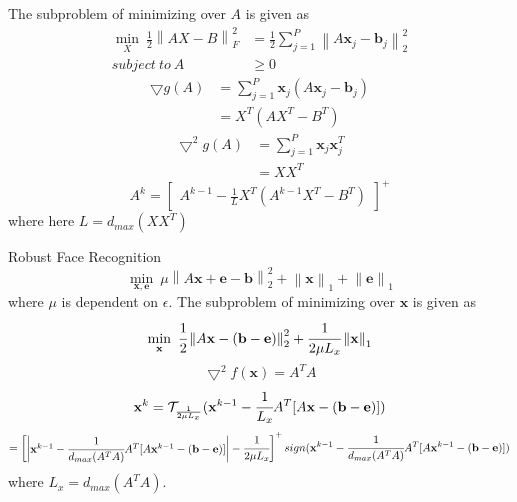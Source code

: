 \documentclass[paper=a4, fontsize=11pt]{scrartcl} %
\makeatletter
\numberwithin{equation}{section} %
\numberwithin{figure}{section} %
\numberwithin{table}{section} %
\renewcommand{\section}{\@startsection{section}{1}{0mm}
  {-\baselineskip}{0.5 \baselineskip}{\bf\leftline}}
\newcommand{\norm}[1]{\left\lVert #1 \right\rVert}
\makeatother
\begin{document}
The subproblem of minimizing over $A$ is given as
\begin{equation}
\begin{split}
 \min_X\ \frac{1}{2}\norm{AX-B}_F^2 &=\frac{1}{2}\sum_{j=1}^P\norm{A\mathbf{x}_j-\mathbf{b}_j}_2^2 \\
 subject~to~A &\geq 0 
\end{split}
\end{equation}
\begin{equation}
\begin{split}
\bigtriangledown g(A) &= \sum_{j=1}^P \mathbf{x}_j(A\mathbf{x}_j-\mathbf{b}_j)\\
& = X^T(AX^T-B^T)
\end{split}
\end{equation}
\begin{equation}
\begin{split}
\bigtriangledown^2 g(A) &= \sum_{j=1}^P \mathbf{x}_j\mathbf{x}_j^T \\
& = XX^T
\end{split}
\end{equation}
\begin{equation}
A^k = \begin{bmatrix}
A^{k-1} - \frac{1}{L}X^T(A^{k-1}X^T-B^T)
\end{bmatrix}^+
\end{equation}
where here $L = d_{max}(XX^T)$
\section{Robust Face Recognition}
\begin{equation}
\min_{\mathbf{x}, \mathbf{e}}\ \mu\norm{A\mathbf{x}+\mathbf{e}-\mathbf{b}}_2^2 + \norm{\mathbf{x}}_1+\norm{\mathbf{e}}_1
\end{equation}
where $\mu$ is dependent on $\epsilon$.
The subproblem of minimizing over $\mathbf{x}$ is given as
\begin{equation}
\min_\mathbf{x}\ \cfrac{1}{2}\norm{A\mathbf{x}-(\mathbf{b}-\mathbf{e})}_2^2+\cfrac{1}{2\mu L_x}\norm{\mathbf{x}}_1
\end{equation}
\begin{equation}
\bigtriangledown^2 f(\mathbf{x}) = A^TA 
\end{equation}
\begin{equation}
\mathbf{x}^k = \mathcal{T}_{\frac{1}{2\mu L_x}}(\mathbf{x}^{k-1} - \cfrac{1}{L_x}A^T[A\mathbf{x}-(\mathbf{b}-\mathbf{e})]) 
\end{equation}
$$ = \begin{bmatrix} \begin{vmatrix}
\mathbf{x}^{k-1} - \cfrac{1}{d_{max}(A^TA)}A^T[A\mathbf{x}^{k-1}-(\mathbf{b}-\mathbf{e})]
\end{vmatrix} - \cfrac{1}{2\mu L_x} \end{bmatrix}^+ sign(\mathbf{x}^{k-1} - \cfrac{1}{d_{max}(A^TA)}A^T[A\mathbf{x}^{k-1}-(\mathbf{b}-\mathbf{e})])$$
where $L_x = d_{max}(A^TA)$.
\end{document}
